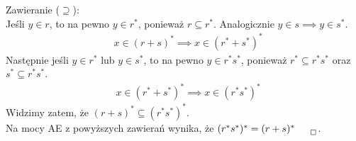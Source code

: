 \documentclass[12pt]{article}
\begin{document}
\noindent
Zawieranie ($\supseteq$):\\
\noindent
Jeśli $y\in r$, to na pewno $y\in r^{*}$, ponieważ $r \subseteq r^{*}$. Analogicznie $y\in s \implies y\in s^{*}$.
\begin{align}
    &x\in (r+s)^{*} \implies x\in (r^{*}+s^{*})^{*}
\end{align}
Następnie jeśli $y\in r^{*}$ lub $y\in s^{*}$, to na pewno $y\in r^{*}s^{*}$, ponieważ $r^{*} \subseteq r^{*}s^{*}$ oraz $s^{*} \subseteq r^{*}s^{*}$.
\begin{align}
    &x\in (r^{*}+s^{*})^{*} \implies x\in (r^{*}s^{*})^{*}
\end{align}
Widzimy zatem, że $(r+s)^{*} \subseteq (r^{*}s^{*})^{*}$.\\

\noindent
Na mocy AE z powyższych zawierań wynika, że $(r^{*}s^{*})^{*} = (r+s)^{*}_{\qed}$.
\end{document}
